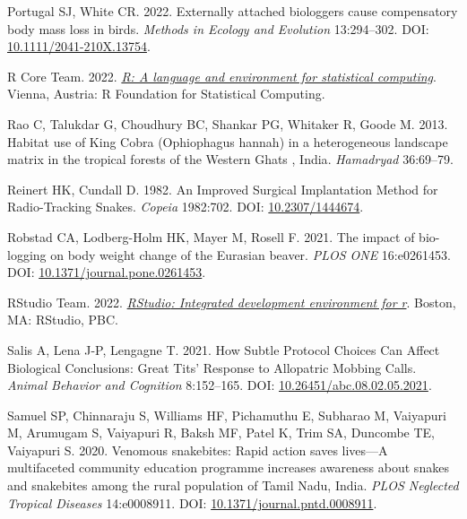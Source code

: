 \documentclass[10pt,a4paper]{article}
\newlength{\cslhangindent}
\newenvironment{CSLReferences}[2] %
 {\begin{list}{}{%
  \setlength{\itemindent}{0pt}
  \setlength{\leftmargin}{0pt}
  \setlength{\parsep}{0pt}
  \ifodd #1
   \setlength{\leftmargin}{\cslhangindent}
   \setlength{\itemindent}{-1\cslhangindent}
  \fi
  \setlength{\itemsep}{#2\baselineskip}}}
 {\end{list}}
\begin{document}
\begin{CSLReferences}{1}{0}
Portugal SJ, White CR. 2022. Externally attached biologgers cause compensatory body mass loss in birds. \emph{Methods in Ecology and Evolution} 13:294--302. DOI: \href{https://doi.org/10.1111/2041-210X.13754}{10.1111/2041-210X.13754}.

R Core Team. 2022. \emph{\href{https://www.R-project.org/}{R: A language and environment for statistical computing}}. Vienna, Austria: R Foundation for Statistical Computing.

Rao C, Talukdar G, Choudhury BC, Shankar PG, Whitaker R, Goode M. 2013. Habitat use of {King} {Cobra} ({Ophiophagus} hannah) in a heterogeneous landscape matrix in the tropical forests of the {Western} {Ghats} , {India}. \emph{Hamadryad} 36:69--79.

Reinert HK, Cundall D. 1982. An {Improved} {Surgical} {Implantation} {Method} for {Radio}-{Tracking} {Snakes}. \emph{Copeia} 1982:702. DOI: \href{https://doi.org/10.2307/1444674}{10.2307/1444674}.

Robstad CA, Lodberg-Holm HK, Mayer M, Rosell F. 2021. The impact of bio-logging on body weight change of the {Eurasian} beaver. \emph{PLOS ONE} 16:e0261453. DOI: \href{https://doi.org/10.1371/journal.pone.0261453}{10.1371/journal.pone.0261453}.

RStudio Team. 2022. \emph{\href{http://www.rstudio.com/}{{RStudio}: Integrated development environment for r}}. Boston, MA: RStudio, PBC.

Salis A, Lena J-P, Lengagne T. 2021. How {Subtle} {Protocol} {Choices} {Can} {Affect} {Biological} {Conclusions}: {Great} {Tits}' {Response} to {Allopatric} {Mobbing} {Calls}. \emph{Animal Behavior and Cognition} 8:152--165. DOI: \href{https://doi.org/10.26451/abc.08.02.05.2021}{10.26451/abc.08.02.05.2021}.

Samuel SP, Chinnaraju S, Williams HF, Pichamuthu E, Subharao M, Vaiyapuri M, Arumugam S, Vaiyapuri R, Baksh MF, Patel K, Trim SA, Duncombe TE, Vaiyapuri S. 2020. Venomous snakebites: {Rapid} action saves lives---{A} multifaceted community education programme increases awareness about snakes and snakebites among the rural population of {Tamil} {Nadu}, {India}. \emph{PLOS Neglected Tropical Diseases} 14:e0008911. DOI: \href{https://doi.org/10.1371/journal.pntd.0008911}{10.1371/journal.pntd.0008911}.


\end{CSLReferences}
\end{document}
